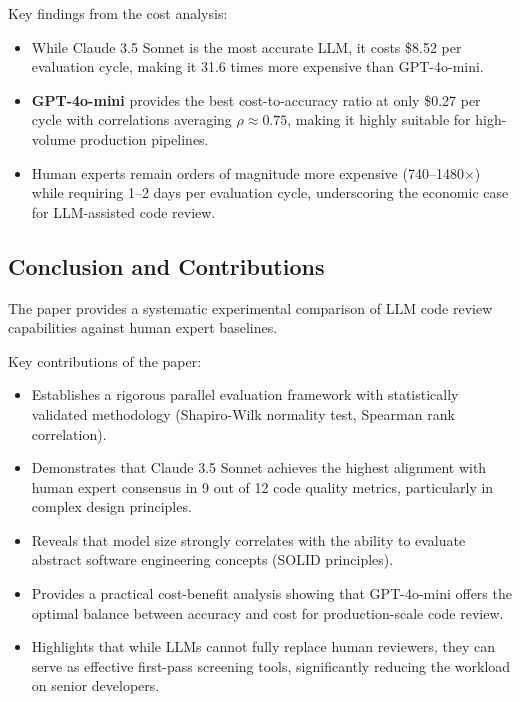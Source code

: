 Key findings from the cost analysis:
\begin{itemize}
    \item While Claude 3.5 Sonnet is the most accurate LLM, it costs \$8.52 per evaluation cycle, making it 31.6 times more expensive than GPT-4o-mini.
    \item \textbf{GPT-4o-mini} provides the best cost-to-accuracy ratio at only \$0.27 per cycle with correlations averaging $\rho \approx 0.75$, making it highly suitable for high-volume production pipelines.
    \item Human experts remain orders of magnitude more expensive (740--1480$\times$) while requiring 1--2 days per evaluation cycle, underscoring the economic case for LLM-assisted code review.
\end{itemize}

\subsection{Conclusion and Contributions}
The paper provides a systematic experimental comparison of LLM code review capabilities against human expert baselines.

Key contributions of the paper:
\begin{itemize}
    \item Establishes a rigorous parallel evaluation framework with statistically validated methodology (Shapiro-Wilk normality test, Spearman rank correlation).
    \item Demonstrates that Claude 3.5 Sonnet achieves the highest alignment with human expert consensus in 9 out of 12 code quality metrics, particularly in complex design principles.
    \item Reveals that model size strongly correlates with the ability to evaluate abstract software engineering concepts (SOLID principles).
    \item Provides a practical cost-benefit analysis showing that GPT-4o-mini offers the optimal balance between accuracy and cost for production-scale code review.
    \item Highlights that while LLMs cannot fully replace human reviewers, they can serve as effective first-pass screening tools, significantly reducing the workload on senior developers.
\end{itemize}
